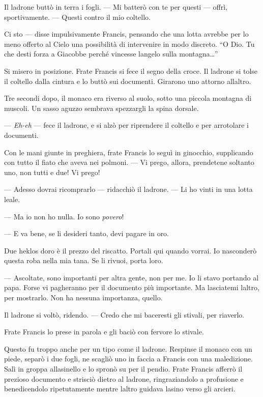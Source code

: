 Il ladrone buttò in terra i fogli. --- Mi batterò con te per questi ---
offrì, sportivamente. --- Questi contro il mio coltello.

Ci sto --- disse impulsivamente Francis, pensando che una lotta avrebbe
per lo meno offerto al Cielo una possibilità di intervenire in modo
discreto. ``O Dio. Tu che desti forza a Giacobbe perché vincesse
l\textquotesingle angelo sulla montagna\ldots''

Si misero in posizione. Frate Francis si fece il segno della croce. Il
ladrone si tolse il coltello dalla cintura e lo buttò sui documenti.
Girarono uno attorno all\textquotesingle altro.

Tre secondi dopo, il monaco era riverso al suolo, sotto una piccola
montagna di muscoli. Un sasso aguzzo sembrava spezzargli la spina
dorsale.

--- \emph{Eh-eh} --- fece il ladrone, e si alzò per riprendere il
coltello e per arrotolare i documenti.

Con le mani giunte in preghiera, frate Francis lo seguì in ginocchio,
supplicando con tutto il fiato che aveva nei polmoni. --- Vi prego,
allora, prendetene soltanto uno, non tutti e due! Vi prego!

--- Adesso dovrai ricomprarlo --- ridacchiò il ladrone. --- Li ho vinti
in una lotta leale.

--- Ma io non ho nulla. Io sono \emph{povero}!

--- E va bene, se li desideri tanto, devi pagare in oro.

Due heklos d\textquotesingle oro è il prezzo del riscatto. Portali qui
quando vorrai. Io nasconderò questa roba nella mia tana. Se li rivuoi,
porta l\textquotesingle oro.

--- Ascoltate, sono importanti per altra gente, non per me. Io li stavo
portando al papa. Forse vi pagheranno per il documento più importante.
Ma lasciatemi l\textquotesingle altro, per mostrarlo. Non ha nessuna
importanza, quello.

Il ladrone si voltò, ridendo. --- Credo che mi baceresti gli stivali,
per riaverlo.

Frate Francis lo prese in parola e gli baciò con fervore lo stivale.

Questo fu troppo anche per un tipo come il ladrone. Respinse il monaco
con un piede, separò i due fogli, ne scagliò uno in faccia a Francis con
una maledizione. Salì in groppa all\textquotesingle asinello e lo spronò
su per il pendio. Frate Francis afferrò il prezioso documento e strisciò
dietro al ladrone, ringraziandolo a profusione e benedicendolo
ripetutamente mentre l\textquotesingle altro guidava
l\textquotesingle asino verso gli arcieri.

